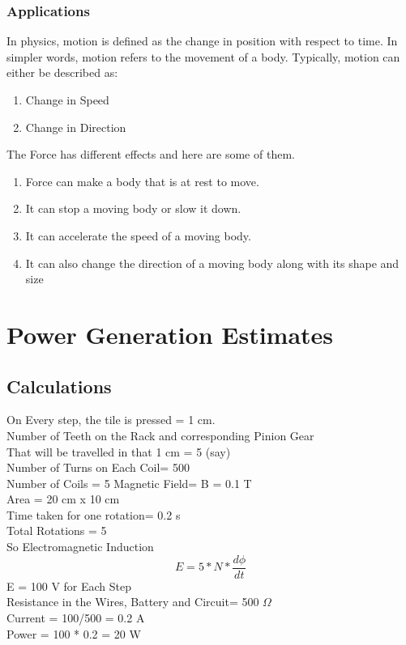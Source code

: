 \documentclass[11pt]{article}
\begin{document}
\subsubsection{Applications}
In physics, motion is defined as the change in position with respect to time. In simpler
words, motion refers to the movement of a body. Typically, motion can either be
described as:
\begin{enumerate}
	\item Change in Speed
	\item Change in Direction
\end{enumerate}
The Force has different effects and here are some of them.
\begin{enumerate}
	\item Force can make a body that is at rest to move.
	\item It can stop a moving body or slow it down.
	\item It can accelerate the speed of a moving body.
	\item It can also change the direction of a moving body along with its shape and size
\end{enumerate}


\pagebreak
\section{Power Generation Estimates}

\subsection{Calculations}
\noindent
On Every step, the tile is pressed \hfill = 1 cm.\\
Number of Teeth on the Rack and corresponding Pinion Gear\\
That will be travelled in that 1 cm \hfill= 5 (say)\\
Number of Turns on Each Coil\hfill = 500\\
Number of Coils = 5
Magnetic Field\hfill = B = 0.1 T\\
Area \hfill= 20 cm x 10 cm\\
Time taken for one rotation\hfill = 0.2 s\\
Total Rotations \hfill= 5\\
So Electromagnetic Induction \\
$$ E = 5 * N* \frac{d\phi}{dt} $$
E = 100 V for Each Step\\

\noindent
Resistance in the Wires, Battery and Circuit\hfill= 500 $ \Omega $\\
Current \hfill= 100/500 = 0.2 A\\
Power \hfill= 100 * 0.2 = 20 W\\
\end{document}
